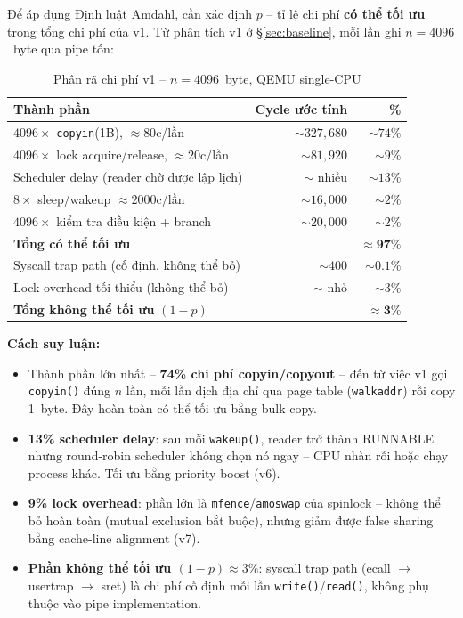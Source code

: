 \documentclass[12pt,a4paper]{article}
\newcommand{\code}[1]{\texttt{#1}}
\newcommand{\tightlist}{\setlength{\itemsep}{2pt}\setlength{\parskip}{0pt}}
\begin{document}
Để áp dụng Định luật Amdahl, cần xác định $p$ -- tỉ lệ chi phí \textbf{có thể tối ưu}
trong tổng chi phí của v1. Từ phân tích v1 ở \S\ref{sec:baseline}, mỗi lần ghi
$n = 4096$~byte qua pipe tốn:

\begin{table}[H]
\centering
\caption{Phân rã chi phí v1 -- $n = 4096$~byte, QEMU single-CPU}
\label{tab:cost_breakdown}
\begin{tabular}{lrr}
\toprule
\textbf{Thành phần} & \textbf{Cycle ước tính} & \textbf{\%} \\
\midrule
$4096 \times$ \code{copyin}(1B), $\approx 80$c/lần
  & $\sim 327{,}680$ & $\sim 74\%$ \\
$4096 \times$ lock acquire/release, $\approx 20$c/lần
  & $\sim 81{,}920$ & $\sim 9\%$ \\
Scheduler delay (reader chờ được lập lịch)
  & $\sim$ nhiều & $\sim 13\%$ \\
$8 \times$ sleep/wakeup $\approx 2000$c/lần
  & $\sim 16{,}000$ & $\sim 2\%$ \\
$4096 \times$ kiểm tra điều kiện + branch
  & $\sim 20{,}000$ & $\sim 2\%$ \\
\midrule
\textbf{Tổng có thể tối ưu} & & $\approx \mathbf{97\%}$ \\
\midrule
Syscall trap path (cố định, không thể bỏ)
  & $\sim 400$ & $\sim 0.1\%$ \\
Lock overhead tối thiểu (không thể bỏ)
  & $\sim$ nhỏ & $\sim 3\%$ \\
\midrule
\textbf{Tổng không thể tối ưu} $(1-p)$ & & $\approx \mathbf{3\%}$ \\
\bottomrule
\end{tabular}
\end{table}

\textbf{Cách suy luận:}
\begin{itemize}\tightlist
  \item Thành phần lớn nhất -- \textbf{74\% chi phí copyin/copyout} -- đến từ việc v1
  gọi \code{copyin()} đúng $n$ lần, mỗi lần dịch địa chỉ qua page table
  (\code{walkaddr}) rồi copy 1~byte. Đây hoàn toàn có thể tối ưu bằng bulk copy.
  \item \textbf{13\% scheduler delay}: sau mỗi \code{wakeup()}, reader trở thành
  RUNNABLE nhưng round-robin scheduler không chọn nó ngay -- CPU nhàn rỗi hoặc
  chạy process khác. Tối ưu bằng priority boost (v6).
  \item \textbf{9\% lock overhead}: phần lớn là \code{mfence}/\code{amoswap} của
  spinlock -- không thể bỏ hoàn toàn (mutual exclusion bắt buộc), nhưng giảm được
  false sharing bằng cache-line alignment (v7).
  \item \textbf{Phần không thể tối ưu $(1-p) \approx 3\%$}: syscall trap path
  (ecall $\to$ usertrap $\to$ sret) là chi phí cố định mỗi lần \code{write()}/\code{read()},
  không phụ thuộc vào pipe implementation.
\end{itemize}
\end{document}
